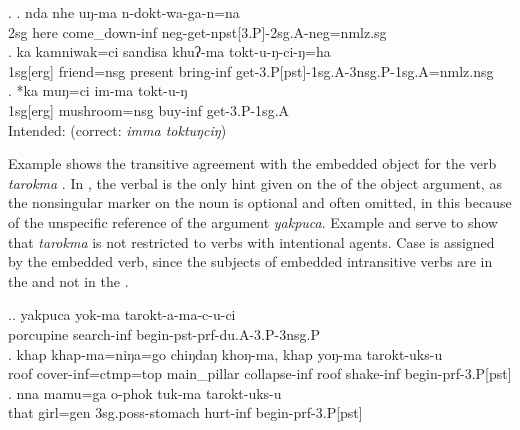 \ex. \ag. nda nhe uŋ-ma n-dokt-wa-ga-n=na\\
{\sc 2sg} here come\_down-{\sc inf} {\sc neg}-get{\sc -npst[3.P]-2sg.A-neg=nmlz.sg}\\
 
\bg. ka kamniwak=ci sandisa  khuʔ-ma tokt-u-ŋ-ci-ŋ=ha\\
{\sc 1sg[erg]} friend{\sc =nsg} present bring-{\sc inf} get-{\sc 3.P[pst]-1sg.A-3nsg.P-1sg.A=nmlz.nsg}\\
	\bg. *ka muŋ=ci im-ma tokt-u-ŋ\\
		{\sc 1sg[erg]} mushroom{\sc =nsg} buy{\sc -inf} get-{\sc 3.P-1sg.A}\\
	Intended:   (correct: \emph{imma toktuŋciŋ})


Example \Next shows the transitive agreement with the embedded object for the verb \emph{tarokma} . In \Next[a], the verbal  is the only hint given on the  of the object argument, as the nonsingular marker on the noun is optional and often omitted, in this  because of  the unspecific reference of the argument \emph{yakpuca}. Example \Next[b] and \Next[c] serve to show  that \emph{tarokma} is  not restricted to verbs with intentional agents. 
Case is assigned by the embedded verb, since the subjects of embedded intransitive verbs are in the  and not in the . 


\ex.\ag. yakpuca yok-ma tarokt-a-ma-c-u-ci\\
porcupine search-{\sc inf} begin{\sc -pst-prf-du.A-3.P-3nsg.P}\\
\bg. khap khap-ma=niŋa=go chiŋdaŋ  khoŋ-ma,  khap yoŋ-ma tarokt-uks-u\\
		roof cover{\sc -inf=ctmp=top} main\_pillar collapse{\sc -inf} 	roof  shake{\sc -inf} begin{\sc [3sg.A]-prf-3.P[pst]}	\\
	 
\bg. nna  mamu=ga    o-phok            tuk-ma           tarokt-uks-u\\
that girl{\sc =gen} {\sc 3sg.poss-}stomach hurt{\sc -inf} begin{\sc [3sg.A]-prf-3.P[pst]}\\
 


